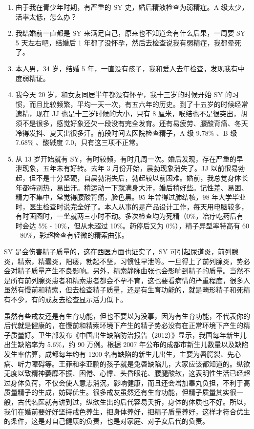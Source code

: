 \documentclass[fontset=founder]{ctexart}
\begin{document}
\begin{enumerate}
    \item 由于我在青少年时期，有严重的 SY 史，婚后精液检查为弱精症。A 级太少，活率太低，怎么办？
    \item 我结婚前一直都是 SY 来满足自己，原来也不知道会有什么后果，一周要 SY 5 天左右吧，结婚后 1 年都了没怀孕，然后去检查说我有弱精症，我都晕死了。
    \item 本人男，34 岁，结婚 5 年，一直没有孩子，我和爱人去年检查，发现我有中度弱精证。
    \item 我今天 20 岁，和女友同居半年都没有怀孕，我十三岁的时候开始 SY 的习惯，而且比较频繁，平均一天一次，有五六年的历史。到了十五岁的时候经常遗精，现在 JJ 也是十三岁时候的大小，只有 8 厘米，喉结也不是很突出，胡须不是很多，感觉好象还欠一段没有完全发育。还有易疲劳、腰酸背痛、冬天冷得发抖、夏天出很多汗。前段时间去医院检查精子，A 级 9.78\% 、B 级 7.68\% 、酸碱度 7.0，只有这三项不正常。
    \item 从 13 岁开始就有 SY，有时较频，有时几周一次。婚后发现，存在严重的早泄现象，五年未有好转。去年 3 月份开始，晨勃现象消失了。JJ 以前很易勃起，但不是十分坚硬，自晨勃消失后，勃起较以前困难。婚前，我总觉身体长年都特别热，易出汗。稍运动一下就满身大汗，婚后稍好些。记性差、易困、精力不集中，常觉得腰酸背痛，脸色黑。95 年曾得过肺结核，98 年大学毕业时，医生检查时说完全好了。本人从事的是产品设计工作，每天用电脑较多，有时画图时，一坐就两三小时不动。多次检查均为死精（0\%，冶疗吃药后有时会达 5\% - 10\%，但从未超过 10\%。药停后又为 0\%），精子异型率特高有 60 - 80\%，彩超检查有轻微的精索曲张。
\end{enumerate}

SY 是会伤害精子质量的，这在西医方面也证实了，SY 可引起尿道炎，前列腺炎，精索，精囊炎，阳痿，勃起不坚，习惯性早泄等。一旦得上了前列腺炎，势必会对精子质量产生不良影响。另外，精索静脉曲张也会影响到精子的质量。当然不是所有前列腺炎患者和精索患者都会不孕不育，这也要看病情的严重程度，很多人虽然有慢前和精索，但去检查精子质量，还是有生育功能的，就是畸形精子和死精有不少，有的戒友去检查显示活力低下。

虽然有些戒友还是有生育功能，但也不要以为没事，因为有生育功能，不代表你的后代就是健康的，在慢前和精索环境下产生的精子势必没有在正常环境下产生的精子质量好。卫生部发布《中国出生缺陷防治报告（2012）》显示，我国每年新生儿出生缺陷率为 5.6\%，约 90 万例。根据 2007 年公布的成都市新生儿数量以及缺陷发生率估算，成都每年约有 1200 名有缺陷的新生儿出生，主要为唇腭裂、先心病、听力障碍等。王菲和李亚鹏的孩子就是兔唇缺陷儿，大家应该都知道的。纵欲无度以致精神萎靡不振、困倦、心悸、头昏眼花、腰腿酸软，这表明性生活已经超过身体负荷，不仅会使人意志消沉，影响健康，而且还会增加睾丸负担，不利于高质量精子的生成，妨碍优生。很多戒友虽然还有生育功能，但精子质量其实很一般，古代名医就有讲到过，纵欲生出的后代容易夭折，身体的体质也不好。所以，我们在婚前要好好坚持戒色养生，把身体养好，把精子质量养好，这样才符合优生的条件，这是对自己健康的负责，也是对家庭、对子女后代的负责。
\end{document}
